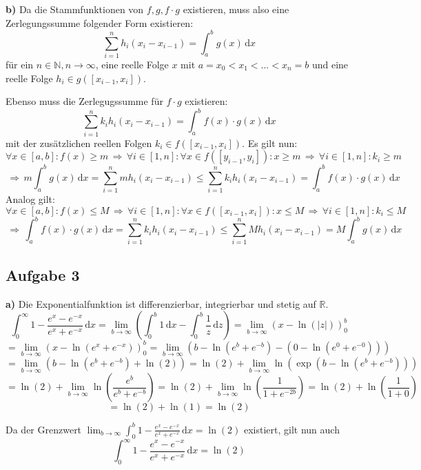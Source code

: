 \documentclass[a4paper,graphics,11pt]{article}
\newcommand{\aufgabe}[1]{\subsection*{Aufgabe #1}}
\begin{document}
\textbf{b)}
Da die Stammfunktionen von $f, g, f\cdot g$ existieren, muss also eine Zerlegungssumme folgender Form existieren:
$$
	\sum_{i=1}^{n} h_i(x_i-x_{i-1}) = \int_{a}^{b} g(x)\, \mathrm{d}x
$$
für ein $n \in \mathbb{N}, n \to \infty$, eine reelle Folge $x$ mit $a = x_0 < x_1 < ... < x_n = b$ und eine
reelle Folge $h_i \in g([x_{i-1}, x_i])$.

Ebenso muss die Zerlegugssumme für $f\cdot g$ existieren:
$$
	\sum_{i=1}^{n} k_ih_i(x_i-x_{i-1}) = \int_{a}^{b} f(x)\cdot g(x)\, \mathrm{d}x
$$
mit der zusätzlichen reellen Folgen $k_i \in f([x_{i-1}, x_i])$.
Es gilt nun:
$$
	\forall x \in [a,b]\colon f(x) \geq m \,\Longrightarrow\, \forall i \in [1,n]\colon \forall x \in f([y_{i-1}, y_i])\colon x \geq m \,\Longrightarrow\, \forall i \in [1,n]\colon k_i \geq m
$$$$
	\,\Longrightarrow\, m\int_{a}^{b} g(x)\, \mathrm{d}x
	= \sum_{i=1}^{n} mh_i(x_i-x_{i-1}) 
	\leq \sum_{i=1}^{n} k_ih_i(x_i-x_{i-1})
	= \int_{a}^{b} f(x)\cdot g(x)\, \mathrm{d}x
$$
Analog gilt:
$$
	\forall x \in [a,b]\colon f(x) \leq M \,\Longrightarrow\, \forall i \in [1,n]\colon \forall x \in f([x_{i-1}, x_i])\colon x \leq M \,\Longrightarrow\, \forall i \in [1,n]\colon k_i \leq M
$$$$
	\,\Longrightarrow\, \int_{a}^{b} f(x)\cdot g(x)\, \mathrm{d}x
	= \sum_{i=1}^{n} k_ih_i(x_i-x_{i-1})
	\leq \sum_{i=1}^{n} Mh_i(x_i-x_{i-1}) 
	= M\int_{a}^{b} g(x)\, \mathrm{d}x
$$

\newpage
\aufgabe{3}
\textbf{a)}
Die Exponentialfunktion ist differenzierbar, integrierbar und stetig auf $\mathbb{R}$.\\
$$
	\int_{0}^{\infty} 1-\frac{e^x-e^{-x}}{e^x+e^{-x}}\, \mathrm{d}x
	= \lim_{b \to \infty}\left( \int_{0}^{b} 1\, \mathrm{d}x -\int_0^b \frac{1}{z}\, \mathrm{d}z\right)
	= \lim_{b \to \infty}\left(x-\ln(|z|)\right)_0^b
$$$$
	= \lim_{b \to \infty}\left(x-\ln(e^x+e^{-x})\right)_0^b
	= \lim_{b \to \infty}\left(b-\ln(e^b+e^{-b}) - (0 -\ln(e^0+e^{-0}))\right)
$$$$
	= \lim_{b \to \infty}\left(b-\ln(e^b+e^{-b}) +\ln(2)\right)
	= \ln(2) + \lim_{b \to \infty} \ln\left(\exp\left(b-\ln(e^b+e^{-b})\right)\right)
$$$$
	= \ln(2) + \lim_{b \to \infty} \ln\left(\frac{e^b}{e^b+e^{-b}}\right)
	= \ln(2) + \lim_{b \to \infty} \ln\left(\frac{1}{1+e^{-2b}}\right)
	= \ln(2) + \ln\left(\frac{1}{1+0}\right)
$$$$
	= \ln(2) + \ln(1) = \ln(2)
$$

Da der Grenzwert $\displaystyle\lim_{b \to \infty} \int_{0}^{b} 1-\frac{e^x-e^{-x}}{e^x+e^{-x}}\, \mathrm{d}x = \ln(2)$
existiert, gilt nun auch
$$
	\int_{0}^{\infty} 1-\frac{e^x-e^{-x}}{e^x+e^{-x}}\, \mathrm{d}x = \ln(2)
$$
\end{document}
